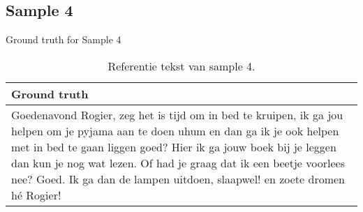 \subsection{Sample 4}
\begin{table}[htbp]
    \centering
    \caption{Ground truth for Sample 4}
    \label{tab:groundtruth_sample4}
    \begin{tabularx}{\textwidth}{|X|}
        \hline
        \textbf{Ground truth} \\
        \hline
        Goedenavond Rogier, zeg het is tijd om in bed te kruipen, ik ga jou helpen om je pyjama aan te doen uhum en dan ga ik je ook helpen met in bed te gaan liggen goed? Hier ik ga jouw boek bij je leggen dan kun je nog wat lezen. Of had je graag dat ik een beetje voorlees nee? Goed. Ik ga dan de lampen uitdoen, slaapwel! en zoete dromen hé Rogier! \\
        \hline
    \end{tabularx}
    \caption{Referentie tekst van sample 4.}
\end{table}

